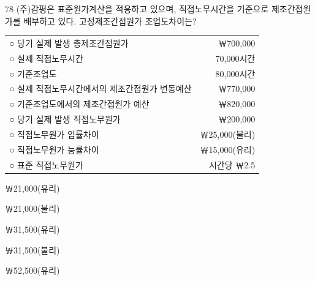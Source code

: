 \begin{question}{78}
(주)감평은 표준원가계산을 적용하고 있으며, 직접노무시간을 기준으로 제조간접원가를 배부하고 있다. 고정제조간접원가 조업도차이는?
\begin{framedtext}
\begin{tabularx}{\linewidth}{@{}Xr@{}}
○ 당기 실제 발생 총제조간접원가 & ￦700,000 \\
○ 실제 직접노무시간 & 70,000시간 \\
○ 기준조업도 & 80,000시간 \\
○ 실제 직접노무시간에서의 제조간접원가 변동예산 & ￦770,000 \\
○ 기준조업도에서의 제조간접원가 예산 & ￦820,000 \\
○ 당기 실제 발생 직접노무원가 & ￦200,000 \\
○ 직접노무원가 임률차이 & ￦25,000(불리) \\
○ 직접노무원가 능률차이 & ￦15,000(유리) \\
○ 표준 직접노무원가 & 시간당 ￦2.5 \\
\end{tabularx}
\end{framedtext}
\begin{choices}
  \item ￦21,000(유리)
  \item ￦21,000(불리)
  \item ￦31,500(유리)
  \item ￦31,500(불리)
  \item ￦52,500(유리)
\end{choices}
\end{question}
